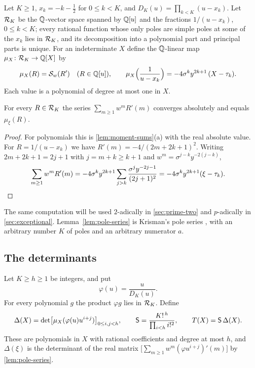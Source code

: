 Let $K\ge1$, $x_k=-k-\frac12$ for $0\le k<K$, and $D_K(u)=\prod_{k<K}(u-x_k)$. Let $\mathcal{R}_K$ be
the $\mathbb{Q}$-vector space spanned by $\mathbb{Q}[u]$ and the fractions $1/(u-x_k)$, $0\le k<K$; every
rational function whose only poles are simple poles at some of the $x_k$ lies in $\mathcal{R}_K$, and
its decomposition into a polynomial part and principal parts is unique. For an indeterminate
$X$ define the $\mathbb{Q}$-linear map $\mu_X\colon\mathcal{R}_K\to\mathbb{Q}[X]$ by
\begin{equation}\label{eq:functional}
  \mu_X(R)=\mathcal{S}_w(R')\quad(R\in\mathbb{Q}[u]),\qquad
  \mu_X\Bigl(\frac1{u-x_k}\Bigr)=-4\sigma^ky^{2k+1}\,(X-\tau_k).
\end{equation}
Each value is a polynomial of degree at most one in $X$.

\begin{lemma}\label{lem:pole-series}
For every $R\in\mathcal{R}_K$ the series $\sum_{m\ge1}w^mR'(m)$ converges absolutely and equals
$\mu_\xi(R)$.
\end{lemma}

\begin{proof}
For polynomials this is \cref{lem:moment-sums}(a) with the real absolute value. For
$R=1/(u-x_k)$ we have $R'(m)=-4/(2m+2k+1)^2$. Writing $2m+2k+1=2j+1$ with $j=m+k\ge k+1$
and $w^m=\sigma^{j-k}y^{-2(j-k)}$,
\[
  \sum_{m\ge1}w^mR'(m)=-4\sigma^ky^{2k+1}\sum_{j>k}\frac{\sigma^jy^{-2j-1}}{(2j+1)^2}
  =-4\sigma^ky^{2k+1}(\xi-\tau_k).\qedhere
\]
\end{proof}

The same computation will be used $2$-adically in \cref{sec:prime-two} and $p$-adically in
\cref{sec:exceptional}. Lemma~\ref{lem:pole-series} is Krisman's pole series
\cite[Lemma~2.1]{Krisman2026chi2}, with an arbitrary number $K$ of poles and an arbitrary
numerator $a$.

\subsection{The determinants}\label{subsec:determinants}

Let $K\ge h\ge1$ be integers, and put
\begin{equation}\label{eq:phi}
  \varphi(u)=\frac{u}{D_K(u)}.
\end{equation}
For every polynomial $g$ the product $\varphi g$ lies in $\mathcal{R}_K$. Define
\begin{equation}\label{eq:Delta-T}
  \Delta(X)=\det\bigl[\mu_X(\varphi(u)u^{i+j})\bigr]_{0\le i,j<h},\qquad
  \mathsf{S}=\frac{K!^{\,h}}{\prod_{i<h}i!^2},\qquad T(X)=\mathsf{S}\,\Delta(X).
\end{equation}
These are polynomials in $X$ with rational coefficients and degree at most $h$, and
$\Delta(\xi)$ is the determinant of the real matrix
$\bigl[\sum_{m\ge1}w^m(\varphi u^{i+j})'(m)\bigr]$ by \cref{lem:pole-series}.

